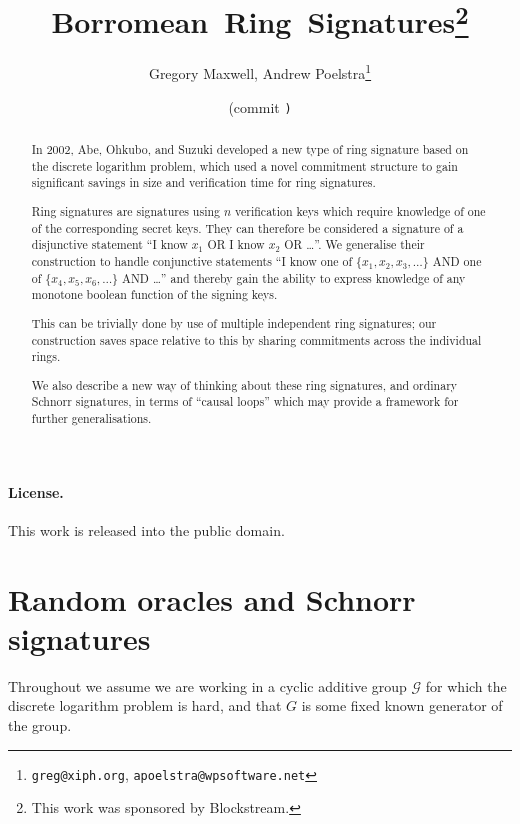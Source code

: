 \documentclass[letterpaper]{article}
\title{Borromean~Ring~Signatures\footnote{This work was sponsored by Blockstream.}}
\author{
  Gregory Maxwell,
  Andrew Poelstra\footnote{
    \texttt{greg@xiph.org},
    \texttt{apoelstra@wpsoftware.net}}
}
\date{\gitAuthorDate{} (commit \texttt{\gitAbbrevHash)}}
\begin{document}
\maketitle
{}

\begin{abstract}
In 2002, Abe, Ohkubo, and Suzuki developed a new type of ring signature based
on the discrete logarithm problem, which used a novel commitment structure to
gain significant savings in size and verification time for ring
signatures\cite{abe+ohkubo+suzuki2002}.

Ring signatures are signatures using $n$ verification keys which require
knowledge of one of the corresponding secret keys. They can therefore be
considered a signature of a disjunctive statement ``I know $x_1$ OR I know
$x_2$ OR \ldots''. We generalise their construction to handle conjunctive
statements ``I know one of $\{x_1, x_2, x_3, \ldots\}$ AND one of
$\{x_4, x_5, x_6, \ldots\}$ AND \ldots''
and thereby gain the ability to express knowledge of any monotone boolean
function of the signing keys.

This can be trivially done by use of multiple independent ring signatures;
our construction saves space relative to this by sharing commitments
across the individual rings.

We also describe a new way of thinking about these ring signatures, and
ordinary Schnorr signatures, in terms of ``causal loops'' which may provide
a framework for further generalisations.
\end{abstract}

\clearpage

\paragraph{License.} This work is released into the public domain.

\modulolinenumbers[10]
\linenumbers

\section{Random oracles and Schnorr signatures}

Throughout we assume we are working in a cyclic additive group $\mathcal{G}$ for
which the discrete logarithm problem is hard, and that $G$ is some fixed known
generator of the group.
\end{document}
